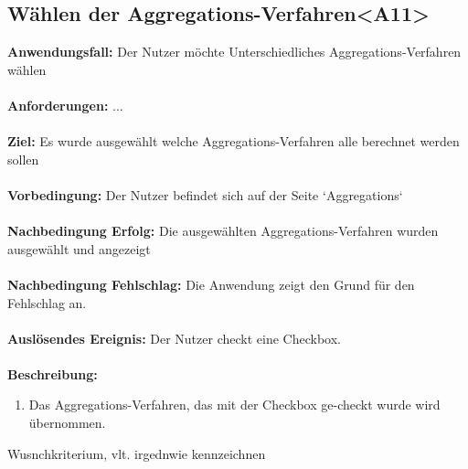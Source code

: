 \documentclass[parskip=full]{scrartcl} %
\begin{document}
\subsection*{Wählen der Aggregations-Verfahren<A11>}
\textbf{Anwendungsfall:} Der Nutzer möchte Unterschiedliches Aggregations-Verfahren wählen\\\\
\textbf{Anforderungen:} ...\\\\
\textbf{Ziel:} Es wurde ausgewählt welche Aggregations-Verfahren alle berechnet werden sollen \\\\
\textbf{Vorbedingung:} Der Nutzer befindet sich auf der Seite `Aggregations`\\\\
\textbf{Nachbedingung Erfolg:} Die ausgewählten Aggregations-Verfahren wurden ausgewählt und angezeigt\\\\
\textbf{Nachbedingung Fehlschlag:} Die Anwendung zeigt den Grund für den Fehlschlag an. \\\\
\textbf{Auslösendes Ereignis:} Der Nutzer checkt eine Checkbox. \\\\
\textbf{Beschreibung:}
\begin{enumerate}
    \item Das Aggregations-Verfahren, das mit der Checkbox ge-checkt wurde wird übernommen.
\end{enumerate}
\newpage

Wusnchkriterium, vlt. irgednwie kennzeichnen
\end{document}
